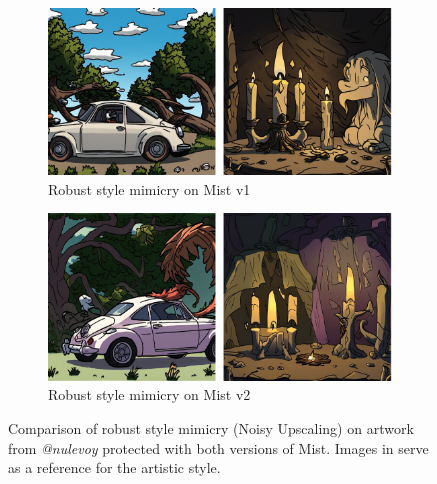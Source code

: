 \documentclass{article}
\begin{document}
\begin{figure}[h]
    \centering
    \begin{subfigure}[b]{0.49\textwidth}
         \centering
         \includegraphics[width=\textwidth]{plots/mist10.pdf}
         \caption{Robust style mimicry on Mist v1}
     \end{subfigure}
     \hfill
     \begin{subfigure}[b]{0.49\textwidth}
         \centering
         \includegraphics[width=\textwidth]{plots/mist20.pdf}
         \caption{Robust style mimicry on Mist v2}
     \end{subfigure}
    \caption{Comparison of robust style mimicry (Noisy Upscaling) on artwork from \emph{@nulevoy} protected with both versions of Mist. Images in  serve as a reference for the artistic style.}
    \label{fig:mist20mimicry}
\end{figure}
\end{document}
